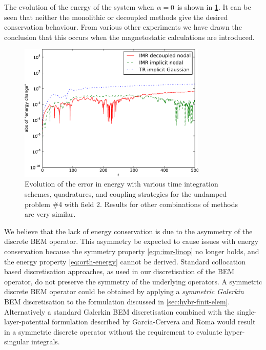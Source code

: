 The evolution of the energy of the system when $\alpha = 0$ is shown in \cref{fig:energy-conservation}.
It can be seen that neither the monolithic or decoupled methods give the desired conservation behaviour.
From various other experiments we have drawn the conclusion that this occurs when the magnetostatic calculations are introduced.
\begin{figure}
  \centering
  \includegraphics[width=0.8\textwidth]
  {plots/sq_mumag4_energy_conservation/absofenergychangevstimes.pdf}
  \caption{
    Evolution of the error in energy
    with various time integration schemes, quadratures, and coupling strategies
    for the undamped \mumag problem \#4 with field 2.
    Results for other combinations of methods are very similar.
  }
  \label{fig:energy-conservation}
\end{figure}

We believe that the lack of energy conservation is due to the asymmetry of the discrete BEM operator.
This asymmetry be expected to cause issues with energy conservation because the symmetry property \cref{eqn:imr-linop} no longer holds, and the energy property \cref{eq:orth-energy} cannot be derived.
Standard collocation based discretisation approaches, as used in our discretisation of the BEM operator, do not preserve the symmetry of the underlying operators.
A symmetric discrete BEM operator could be obtained by applying a \emph{symmetric Galerkin} BEM discretisation \cite{Bonnet2003} \cite[75]{Wrobel2002} to the formulation discussed in \cref{sec:hybr-finit-elem}.
Alternatively a standard Galerkin BEM discretisation combined with the single-layer-potential formulation described by Garc\'{i}a-Cervera and Roma \cite{Garcia-Cervera2006} \cite[19]{Knittel2011} would result in a symmetric discrete operator without the requirement to evaluate hyper-singular integrals.



